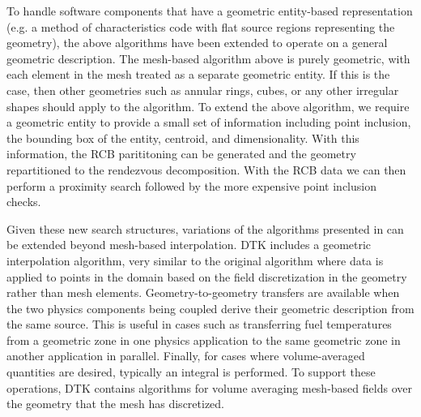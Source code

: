 \documentclass{mc2013}
\begin{document}
\label{subsec:general_geometry}

To handle software components that have a geometric entity-based
representation (e.g. a method of characteristics code with flat source
regions representing the geometry), the above algorithms have been
extended to operate on a general geometric description. The mesh-based
algorithm above is purely geometric, with each element in the mesh
treated as a separate geometric entity. If this is the case, then
other geometries such as annular rings, cubes, or any other irregular
shapes should apply to the algorithm. To extend the above algorithm,
we require a geometric entity to provide a small set of information
including point inclusion, the bounding box of the entity, centroid,
and dimensionality. With this information, the RCB parititoning can be
generated and the geometry repartitioned to the rendezvous
decomposition. With the RCB data we can then perform a proximity
search followed by the more expensive point inclusion checks. 

Given these new search structures, variations of the algorithms
presented in \cite{Plimpton_2004} can be extended beyond mesh-based
interpolation. DTK includes a geometric interpolation algorithm, very
similar to the original algorithm where data is applied to points in
the domain based on the field discretization in the geometry rather
than mesh elements. Geometry-to-geometry transfers are available when
the two physics components being coupled derive their geometric
description from the same source. This is useful in cases such as
transferring fuel temperatures from a geometric zone in one physics
application to the same geometric zone in another application in
parallel. Finally, for cases where volume-averaged quantities are
desired, typically an integral is performed. To support these
operations, DTK contains algorithms for volume averaging mesh-based
fields over the geometry that the mesh has discretized.

\label{sec:examples}

\label{subsec:cht}

\label{subsec:cfd_neutronics}

\label{sec:scaling_study}
\end{document}
